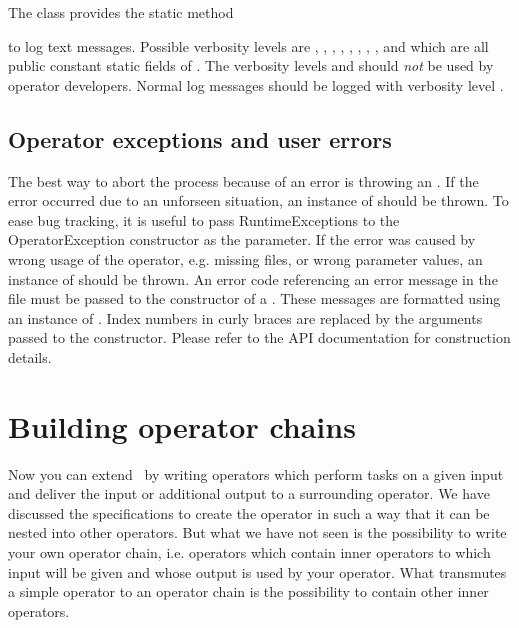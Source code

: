The class  provides the static method 
\begin{center}
\end{center}
to log text messages. Possible verbosity levels are , ,
, , , , , , and
 which are all public constant static fields of
. The verbosity levels  and  should \emph{not}
be used by operator developers. Normal log messages should be logged with
verbosity level .


\subsection{Operator exceptions and user errors}

The best way to abort the process because of an error is throwing an
. If the error occurred due to an unforseen
situation, an instance of  should be
thrown. To ease bug tracking, it is useful to pass RuntimeExceptions
to the OperatorException constructor as the  parameter.
If the error was caused by wrong usage of the operator, e.g. missing
files, or wrong parameter values, an instance of 
should be thrown. An error code referencing an error message in the
file  must be passed
to the constructor of a . These messages are formatted
using an instance of . Index numbers in curly
braces are replaced by the arguments passed to the 
constructor. Please refer to the API documentation for construction
details.




\section{Building operator chains}

Now you can extend \rapidminer\ by writing operators which perform tasks on a
given input and deliver the input or additional output to a
surrounding operator. We have discussed the specifications to create
the operator in such a way that it can be nested into other
operators. But what we have not seen is the possibility to write your
own operator chain, i.e. operators which contain inner operators to
which input will be given and whose output is used by your
operator. What transmutes a simple operator to an operator chain is the
possibility to contain other inner operators.

